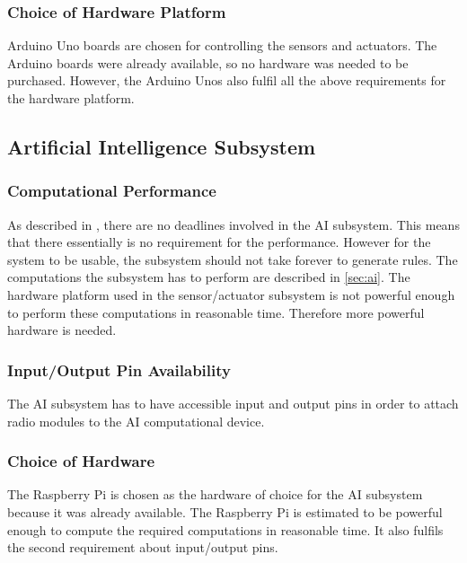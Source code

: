 \subsubsection{Choice of Hardware Platform}
Arduino Uno boards are chosen for controlling the sensors and actuators. The Arduino boards were already available, so no hardware was needed to be purchased. However, the Arduino Unos also fulfil all the above requirements for the hardware platform.

\subsection{Artificial Intelligence Subsystem}

\subsubsection{Computational Performance}
As described in , there are no deadlines involved in the AI subsystem. This means that there essentially is no requirement for the performance. However for the system to be usable, the subsystem should not take forever to generate rules. The computations the subsystem has to perform are described in \cref{sec:ai}. The hardware platform used in the sensor/actuator subsystem is not powerful enough to perform these computations in reasonable time. Therefore more powerful hardware is needed.

\subsubsection{Input/Output Pin Availability}
The AI subsystem has to have accessible input and output pins in order to attach radio modules to the AI computational device.

\subsubsection{Choice of Hardware}
The Raspberry Pi is chosen as the hardware of choice for the AI subsystem because it was already available. The Raspberry Pi is estimated to be powerful enough to compute the required computations in reasonable time. It also fulfils the second requirement about input/output pins.
